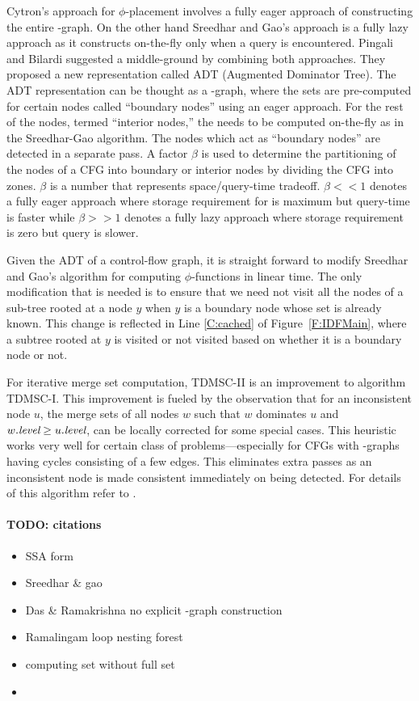 {Cytron's approach for $\phi$-placement involves a fully eager approach of constructing the entire \DF-graph. On the other hand Sreedhar and Gao's approach is a fully lazy approach as it constructs \DF on-the-fly only when a query is encountered.
Pingali and Bilardi \cite{bilardi} suggested a middle-ground by combining both 
approaches. They proposed a new representation called ADT (Augmented Dominator 
Tree). The ADT representation can be thought as a \DJ-graph, where the \DF sets 
are pre-computed for certain nodes called ``boundary nodes'' using an eager 
approach. For the rest of the nodes, termed ``interior nodes,'' the \DF needs 
to be computed on-the-fly as in the Sreedhar-Gao algorithm. The nodes which act 
as ``boundary nodes'' are detected in a separate pass. A factor $\beta$ is used 
to determine the partitioning of the nodes of a CFG into boundary or interior 
nodes by dividing the CFG into zones. $\beta$ is a number that represents 
space/query-time tradeoff. $\beta <\!\!< 1$ denotes a fully eager approach where 
storage requirement for \DF is maximum but query-time is faster while 
$\beta >\!\!> 1$ denotes a fully lazy approach where storage requirement is zero but 
query is 
slower. 

Given the ADT of a control-flow graph, it is straight forward to 
modify  Sreedhar and Gao's algorithm for computing $\phi$-functions in linear time. The only modification that is needed is to ensure that we need not visit all the nodes of a sub-tree rooted at a node $y$ when $y$ is a boundary node whose \DF set is already known. This change is reflected in Line \ref{C:cached} of Figure~\ref{F:IDFMain}, where a subtree rooted at $y$ is visited or not visited based on whether it is a boundary node or not.

For iterative merge set computation, TDMSC-II is an improvement to algorithm 
TDMSC-I. This improvement is fueled by the observation that for an inconsistent 
node $u$, the merge sets of all nodes $w$ such that $w$ dominates $u$ and 
$w.\textit{level} \geq u.\textit{level}$,
can be locally corrected for some special cases. This
heuristic works very well for certain class of problems---especially for CFGs with \DF-graphs having cycles consisting of a few edges. This eliminates extra passes as an inconsistent node is made consistent immediately on being detected. For details of this algorithm refer to \cite{das}.


\paragraph{TODO: citations}
\begin{itemize}
  \item SSA form \cite{cfr}
  \item Sreedhar \& gao \cite{sreedhar_popl}
  \item Das \& Ramakrishna no explicit \DF-graph construction  \cite{das}
  \item Ramalingam loop nesting forest  \cite{rama}
  \item computing \iDF set without full \DF set \cite{sreedhar_popl,sreedharthesis}
  \item \cite{bilardi} 
\end{itemize}
}
